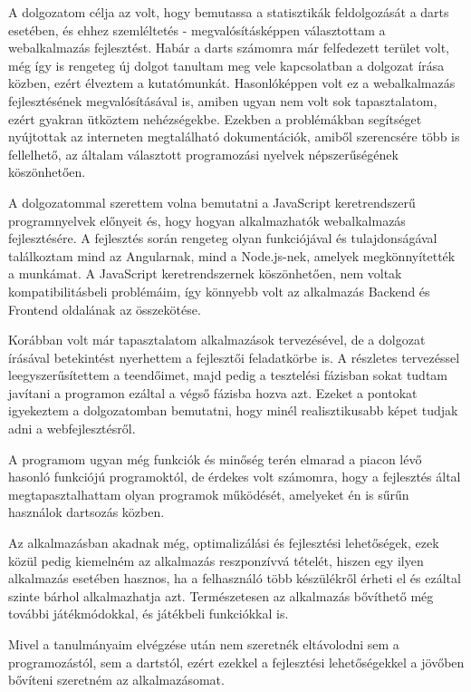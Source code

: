 
A dolgozatom célja az volt, hogy bemutassa a statisztikák feldolgozását a darts esetében, és ehhez szemléltetés - megvalósításképpen választottam a webalkalmazás fejlesztést. Habár a darts számomra már felfedezett terület volt, még így is rengeteg új dolgot tanultam meg vele kapcsolatban a dolgozat írása közben, ezért élveztem a kutatómunkát. Hasonlóképpen volt ez a webalkalmazás fejlesztésének megvalósításával is, amiben ugyan nem volt sok tapasztalatom, ezért gyakran ütköztem nehézségekbe. Ezekben a problémákban segítséget nyújtottak az interneten megtalálható dokumentációk, amiből szerencsére több is fellelhető, az általam választott programozási nyelvek népszerűségének köszönhetően.

A dolgozatommal szerettem volna bemutatni a JavaScript keretrendszerű programnyelvek előnyeit és, hogy hogyan alkalmazhatók webalkalmazás fejlesztésére. A fejlesztés során rengeteg olyan funkciójával és tulajdonságával találkoztam mind az Angularnak, mind a Node.js-nek, amelyek megkönnyítették a munkámat. A JavaScript keretrendszernek köszönhetően, nem voltak kompatibilitásbeli problémáim, így könnyebb volt az alkalmazás Backend és Frontend oldalának az összekötése. 

Korábban volt már tapasztalatom alkalmazások tervezésével, de a dolgozat írásával betekintést nyerhettem a fejlesztői feladatkörbe is. A részletes tervezéssel leegyszerűsítettem a teendőimet, majd pedig a tesztelési fázisban sokat tudtam javítani a programon ezáltal a végső fázisba hozva azt. Ezeket a pontokat igyekeztem a dolgozatomban bemutatni, hogy minél realisztikusabb képet tudjak adni a webfejlesztésről.

A programom ugyan még funkciók és minőség terén elmarad a piacon lévő hasonló funkciójú programoktól, de érdekes volt számomra, hogy a fejlesztés által megtapasztalhattam olyan programok működését, amelyeket én is sűrűn használok dartsozás közben.

Az alkalmazásban akadnak még, optimalizálási és fejlesztési lehetőségek, ezek közül pedig kiemelném az alkalmazás reszponzívvá tételét, hiszen egy ilyen alkalmazás esetében hasznos, ha a felhasználó több készülékről érheti el és ezáltal szinte bárhol alkalmazhatja azt. Természetesen az alkalmazás bővíthető még további játékmódokkal, és játékbeli funkciókkal is.

Mivel a tanulmányaim elvégzése után nem szeretnék eltávolodni sem a programozástól, sem a dartstól, ezért ezekkel a fejlesztési lehetőségekkel a jövőben bővíteni szeretném az alkalmazásomat. 
